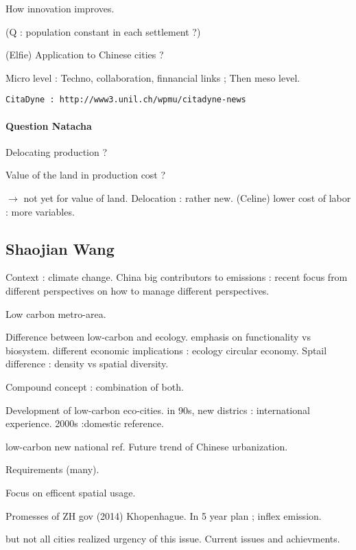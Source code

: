 How innovation improves.

(Q : population constant in each settlement ?)

(Elfie)
Application to Chinese cities ?

Micro level : Techno, collaboration, finnancial links ; Then meso level.

\texttt{CitaDyne : http://www3.unil.ch/wpmu/citadyne-news}


\paragraph{Question Natacha}

Delocating production ?

Value of the land in production cost ?

$\rightarrow$ not yet for value of land. Delocation : rather new. (Celine) lower cost of labor : more variables.




\subsection*{Shaojian Wang}


Context : climate change. China big contributors to emissions : recent focus from different perspectives on how to manage different perspectives.

Low carbon metro-area.


Difference between low-carbon and ecology. emphasis on functionality vs biosystem. different economic implications : ecology circular economy.
Sptail difference : density vs spatial diversity.

Compound concept : combination of both.

Development of low-carbon eco-cities. in 90s, new districs : international experience. 2000s :domestic reference.

low-carbon new national ref. Future trend of Chinese urbanization.

Requirements (many).

Focus on efficent spatial usage.

Promesses of ZH gov (2014) Khopenhague. In 5 year plan ; inflex emission.

but not all cities realized urgency of this issue. Current issues and achievments.

